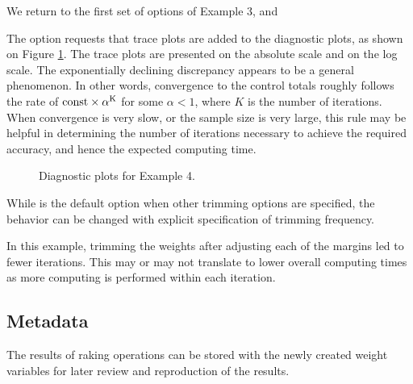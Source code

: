 \begin{stexample}[Example 4]

We return to the first set of options of Example 3, and

\begin{stlog}
\nullskip
\end{stlog}

The option  requests that trace plots are added to
the diagnostic plots, as shown on Figure \ref{fig:example4:sometimes}.
The trace plots are presented on the absolute scale and on the log scale.
The exponentially declining discrepancy appears to be a general phenomenon.
In other words, convergence to the control totals roughly follows
the rate of $\rm{const} \times \alpha^K$ for some $\alpha<1$, where $K$ is
the number of iterations. When convergence is very slow, or the sample
size is very large, this rule may be helpful in determining the number
of iterations necessary to achieve the required accuracy, and hence
the expected computing time.

\begin{figure}[h!]
\begin{center}
\end{center}
\caption{Diagnostic plots for Example 4.}
\label{fig:example4:sometimes}
\end{figure}

While  is the default option when
other trimming options are specified, the behavior can be changed
with explicit specification of trimming frequency.

\begin{stlog}
\nullskip
\end{stlog}

In this example, trimming the weights after adjusting each of the margins
led to fewer iterations. This may or may not translate to lower overall
computing times as more computing is performed within each iteration.

\end{stexample}

\subsection{Metadata}
\label{subsec:example:meta}

The results of raking operations can be stored with the newly created
weight variables for later review and reproduction of the results.

